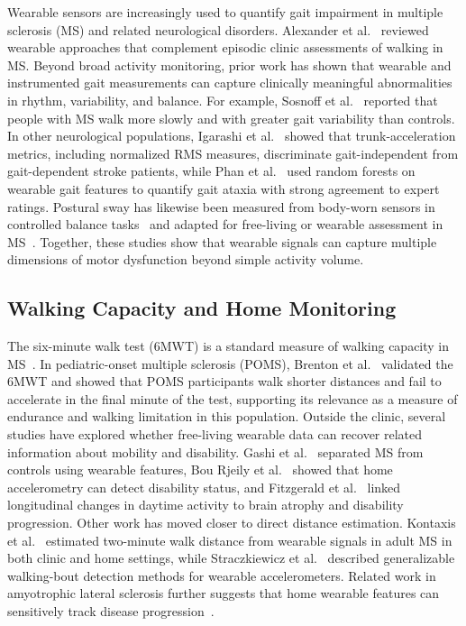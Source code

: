 \documentclass{article}
\begin{document}
Wearable sensors are increasingly used to quantify gait impairment in multiple sclerosis (MS) and related neurological disorders. Alexander et al.~\cite{alexander2021wearable} reviewed wearable approaches that complement episodic clinic assessments of walking in MS. Beyond broad activity monitoring, prior work has shown that wearable and instrumented gait measurements can capture clinically meaningful abnormalities in rhythm, variability, and balance. For example, Sosnoff et al.~\cite{sosnoff2012quantifying} reported that people with MS walk more slowly and with greater gait variability than controls. In other neurological populations, Igarashi et al.~\cite{igarashi2024accelerometer} showed that trunk-acceleration metrics, including normalized RMS measures, discriminate gait-independent from gait-dependent stroke patients, while Phan et al.~\cite{phan2020random} used random forests on wearable gait features to quantify gait ataxia with strong agreement to expert ratings. Postural sway has likewise been measured from body-worn sensors in controlled balance tasks~\cite{mancini2012isway} and adapted for free-living or wearable assessment in MS~\cite{meyer2024assessing,meyer2023chest}. Together, these studies show that wearable signals can capture multiple dimensions of motor dysfunction beyond simple activity volume.

\subsection{Walking Capacity and Home Monitoring}

The six-minute walk test (6MWT) is a standard measure of walking capacity in MS~\cite{goldman2008evaluation,ats2002guidelines}. In pediatric-onset multiple sclerosis (POMS), Brenton et al.~\cite{brenton2022sixminute} validated the 6MWT and showed that POMS participants walk shorter distances and fail to accelerate in the final minute of the test, supporting its relevance as a measure of endurance and walking limitation in this population. Outside the clinic, several studies have explored whether free-living wearable data can recover related information about mobility and disability. Gashi et al.~\cite{gashi2024modeling} separated MS from controls using wearable features, Bou Rjeily et al.~\cite{bourjeily2025accelerometry} showed that home accelerometry can detect disability status, and Fitzgerald et al.~\cite{fitzgerald2026activity} linked longitudinal changes in daytime activity to brain atrophy and disability progression. Other work has moved closer to direct distance estimation. Kontaxis et al.~\cite{Kontaxis2023Automatic} estimated two-minute walk distance from wearable signals in adult MS in both clinic and home settings, while Straczkiewicz et al.~\cite{straczkiewicz2023walking} described generalizable walking-bout detection methods for wearable accelerometers. Related work in amyotrophic lateral sclerosis further suggests that home wearable features can sensitively track disease progression~\cite{gupta2023athome}.
\end{document}
